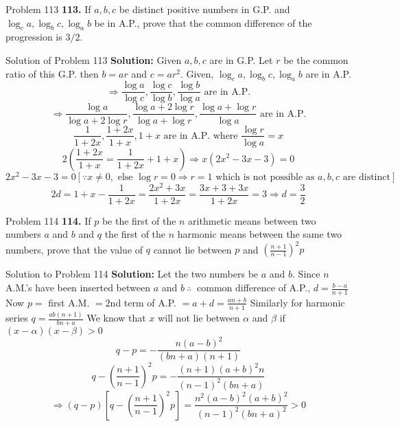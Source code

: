\documentclass[aspectratio=1610,8pt]{beamer}
\begin{document}
\begin{frame}{Problem 113}
  \textbf{113.} If $a, b, c$ be distinct positive numbers in G.P. and $\log_c a, \log_b c, \log_a b$ be in A.P., prove that the
  common difference of the progression is $3/2.$
\end{frame}
\begin{frame}{Solution of Problem 113}
  \textbf{Solution:} Given $a, b, c$ are in G.P. Let $r$ be the common ratio of this G.P. then $b = ar$ and $c = ar^2$.
  \linebreak\linebreak
  Given, $\log_c a, \log_b c, \log_a b$ are in A.P.
  $$\Rightarrow \frac{\log a}{\log c}, \frac{\log c}{\log b}, \frac{\log b}{\log a}\text{~are in A.P.}$$
  $$\Rightarrow \frac{\log a}{\log a + 2\log r}, \frac{\log a + 2\log r}{\log a + \log r}, \frac{\log a + \log r}{\log a}\text{~are
    in A.P.}$$
  $$\frac{1}{1 + 2x}, \frac{1 + 2x}{1 + x}, 1 + x\text{~are in A.P. where~}\frac{\log r}{\log a} = x$$
  $$2\left(\frac{1 + 2x}{1 + x} = \frac{1}{1 + 2x} + 1 + x\right)\Rightarrow x(2x^2 - 3x - 3) = 0$$
  $$2x^2 - 3x - 3 = 0[\because x\neq 0,\text{~else~}\log r = 0 \Rightarrow r = 1\text{~which is not possible as~} a, b, c\text{~are
      distinct}]$$
  $$2d = 1 + x - \frac{1}{1 + 2x} = \frac{2x^2 + 3x}{1 + 2x} = \frac{3x + 3 + 3x}{1 + 2x} = 3\Rightarrow d = \frac{3}{2}$$
\end{frame}
\begin{frame}{Problem 114}
  \textbf{114.} If $p$ be the first of the $n$ arithmetic means between two numbers $a$ and $b$ and $q$ the first of the $n$
  harmonic means between the same two numbers, prove that the value of $q$ cannot lie between $p$ and $\left(\frac{n + 1}{n -
    1}\right)^2p$
\end{frame}
\begin{frame}{Solution to Problem 114}
  \textbf{Solution:} Let the two numbers be $a$ and $b.$ Since $n$ A.M.'s have been inserted between $a$ and $b~\therefore~$ common
  difference of A.P., $d = \frac{b - a}{n + 1}$
  \linebreak\linebreak
  Now $p =$ first A.M. $= 2$nd term of A.P. $= a + d = \frac{an + b}{n + 1}$
  \linebreak\linebreak
  Similarly for harmonic series $q = \frac{ab(n + 1)}{bn + a}$
  \linebreak\linebreak
  We know that $x$ will not lie between $\alpha$ and $\beta$ if $(x - \alpha)(x - \beta) > 0$
  $$q - p = -\frac{n(a - b)^2}{(bn + a)(n + 1)}$$
  $$q - \left(\frac{n + 1}{n - 1}\right)^2p = -\frac{(n + 1)(a + b)^2n}{(n - 1)^2(bn + a)}$$
  $$\Rightarrow (q - p)\left[q - \left(\frac{n + 1}{n - 1}\right)^2p\right] = \frac{n^2(a - b)^2(a + b)^2}{(n - 1)^2(bn + a)^2} > 0$$
\end{frame}
\end{document}
